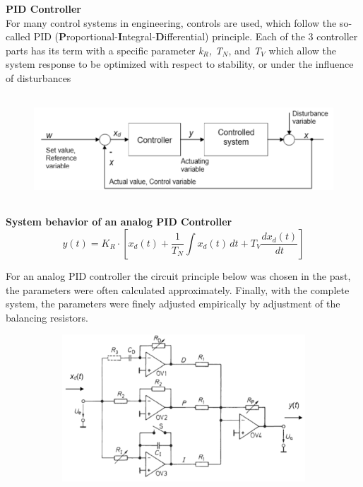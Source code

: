 {\rot\bf PID Controller}\\

For many control systems in engineering, controls are used, which follow the so-called PID (\textbf{P}roportional-\textbf{I}ntegral-\textbf{D}ifferential) principle. Each of the 3 controller parts has its term with a specific parameter \textit{k${}_{R}$,} \textit{T${}_{N}$}, and \textit{T${}_{V}$} which allow the system response to be optimized with respect to stability, or under the influence of disturbances

	\begin{figure}[h]
    \centering
    \includegraphics[width=14cm, height=4cm]{Images/image148.png}
    \label{fig:Fig 101}
    \end{figure}

{\rot\bf System behavior of an analog PID Controller}\\

\begin{equation}
	 y(t)=K_{R} \cdot \left[x_{d} (t)+\frac{1}{T_{N} } \int x_{d} (t)\, dt+T_{V}  \frac{dx_{d} (t)}{dt} \right]
\label{EQ }
\end{equation}

For an analog PID controller the circuit principle below was chosen in the past, the parameters were often calculated approximately. Finally, with the complete system, the parameters were finely adjusted empirically by adjustment of the balancing resistors.

	\begin{figure}[h]
    \centering
    \includegraphics[width=12cm, height=5.5cm]{Images/image149.png}
    \label{fig:Fig 102}
    \end{figure}

